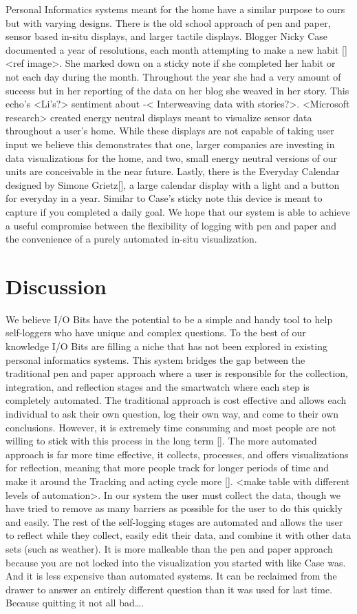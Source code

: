 \documentclass[sigchi-a, authorversion]{acmart}
\begin{document}
Personal Informatics systems meant for the home have a similar purpose to ours but with varying designs. There is the old school approach of pen and paper, sensor based in-situ displays, and larger tactile displays. Blogger Nicky Case documented a year of resolutions, each month attempting to make a new habit [] <ref image>. She marked down on a sticky note if she completed her habit or not each day during the month. Throughout the year she had a very amount of success but in her reporting of the data on her blog she weaved in her story. This echo’s <Li’s?> sentiment about -< Interweaving data with stories?>. <Microsoft research> created energy neutral displays meant to visualize sensor data throughout a user’s home. While these displays are not capable of taking user input we believe this demonstrates that one, larger companies are investing in data visualizations for the home, and two, small energy neutral versions of our units are conceivable in the near future. Lastly, there is the Everyday Calendar designed by Simone Grietz[], a large calendar display with a light and a button for everyday in a year. Similar to Case’s sticky note this device is meant to capture if you completed a daily goal. We hope that our system is able to achieve a useful compromise between the flexibility of logging with pen and paper and the convenience of a purely automated in-situ visualization.

\section{Discussion}
We believe I/O Bits have the potential to be a simple and handy tool to help self-loggers who have unique and complex questions. To the best of our knowledge I/O Bits are filling a niche that has not been explored in existing personal informatics systems. This system bridges the gap between the traditional pen and paper approach where a user is responsible for the collection, integration, and reflection stages and the smartwatch where each step is completely automated. The traditional approach is cost effective and allows each individual to ask their own question, log their own way, and come to their own conclusions. However, it is extremely time consuming and most people are not willing to stick with this process in the long term []. The more automated approach is far more time effective, it collects, processes, and offers visualizations for reflection, meaning that more people track for longer periods of time and make it around the Tracking and acting cycle more []. <make table with different levels of automation>. In our system the user must collect the data, though we have tried to remove as many barriers as possible for the user to do this quickly and easily. The rest of the self-logging stages are automated and allows the user to reflect while they collect, easily edit their data, and combine it with other data sets (such as weather). It is more malleable than the pen and paper approach because you are not locked into the visualization you started with like Case was. And it is less expensive than automated systems. It can be reclaimed from the drawer to answer an entirely different question than it was used for last time. Because quitting it not all bad…. 
\end{document}
